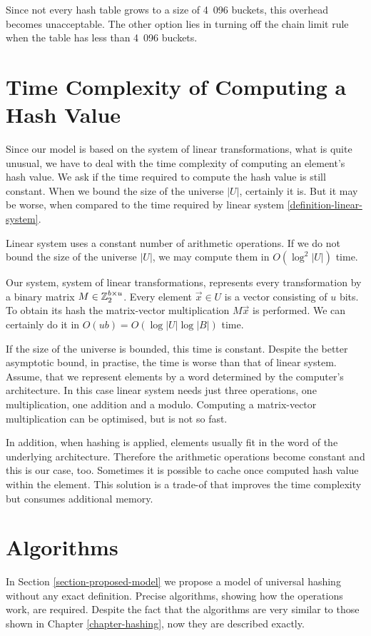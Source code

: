 Since not every hash table grows to a size of 4~096 buckets, this overhead becomes unacceptable. The other option lies in turning off the chain limit rule when the table has less than 4~096 buckets.

\section{Time Complexity of Computing a Hash Value}
\label{section-time-complexity}
Since our model is based on the system of linear transformations, what is quite unusual, we have to deal with the time complexity of computing an element's hash value. We ask if the time required to compute the hash value is still constant. When we bound the size of the universe $|U|$, certainly it is. But it may be worse, when compared to the time required by linear system \ref{definition-linear-system}. 

Linear system uses a constant number of arithmetic operations. If we do not bound the size of the universe $|U|$, we may compute them in $O(\log^2 |U|)$ time. 

Our system, system of linear transformations, represents every transformation by a binary matrix $M \in \mathbb{Z}_{2}^{b \times u}$. Every element $\vec{x} \in U$ is a vector consisting of $u$ bits. To obtain its hash the matrix-vector multiplication $M\vec{x}$ is performed. We can certainly do it in $O(u b) = O(\log |U| \log |B|)$ time. 

If the size of the universe is bounded, this time is constant. Despite the better asymptotic bound, in practise, the time is worse than that of linear system. Assume, that we represent elements by a word determined by the computer's architecture. In this case linear system needs just three operations, one multiplication, one addition and a modulo. Computing a matrix-vector multiplication can be optimised, but is not so fast. 

In addition, when hashing is applied, elements usually fit in the word of the underlying architecture. Therefore the arithmetic operations become constant and this is our case, too. Sometimes it is possible to cache once computed hash value within the element. This solution is a trade-of that improves the time complexity but consumes additional memory.

\section{Algorithms}
In Section \ref{section-proposed-model} we propose a model of universal hashing without any exact definition. Precise algorithms, showing how the operations work, are required. Despite the fact that the algorithms are very similar to those shown in Chapter \ref{chapter-hashing}, now they are described exactly.

